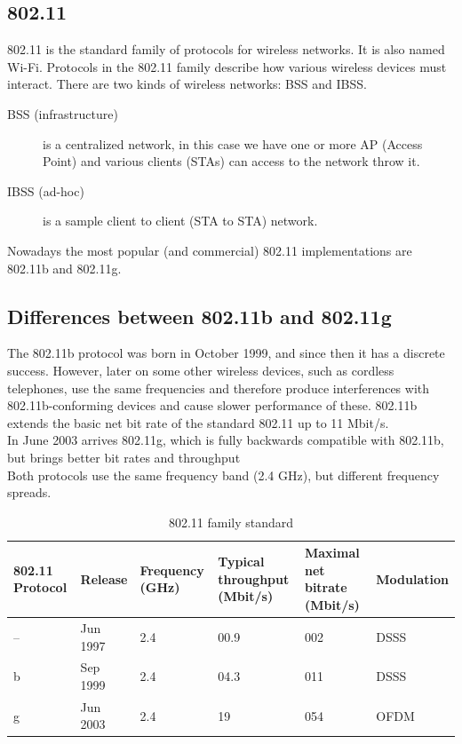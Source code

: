 	\subsection{802.11} \label{theory:prot_specs}
	802.11 is the standard family of protocols for wireless networks. It is also named Wi-Fi. Protocols in the 802.11 family describe how various wireless devices must interact. There are two kinds of wireless networks: BSS and IBSS.
	\begin{description}
		\item[BSS (infrastructure)] is a centralized network, in this case we have one or more AP (Access Point) and various clients (STAs) can access to the network throw it.
		\item[IBSS (ad-hoc)] is a sample client to client (STA to STA) network.
	\end{description}
	Nowadays the most popular (and commercial) 802.11 implementations are 802.11b and 802.11g.
	
	\subsection{Differences between 802.11b and 802.11g} \label{theory:prot_differences}
	
	The 802.11b protocol was born in October 1999, and since then it has a discrete success.  However, later on some other wireless devices, such as cordless telephones, use the same frequencies and therefore produce interferences with 802.11b-conforming devices and cause slower performance of these.
	802.11b extends the basic net bit rate of the standard 802.11 up to 11 Mbit/s.\\
	
	In June 2003 arrives 802.11g, which is fully backwards compatible with 802.11b, but brings better bit rates and throughput\\
	
	Both protocols use the same frequency band (2.4 GHz), but different frequency spreads.
	
	\begin{table}[h]
		
		\begin{tabularx}{15cm}{ | X X X X X X | }
			\hline
				802.11 Protocol & Release & Frequency (GHz) & Typical throughput (Mbit/s) & Maximal net bitrate (Mbit/s) & Modulation \\
			\hline
				-- & Jun 1997 & 2.4 & 00.9 & 002 & DSSS \\
				b & Sep 1999 & 2.4 & 04.3 & 011 & DSSS \\
				g & Jun 2003 & 2.4 & 19 & 054 & OFDM \\
			\hline
		\end{tabularx}
		
		\caption{802.11 family standard}
		\label{802.11_family_standard}
	\end{table}
	
